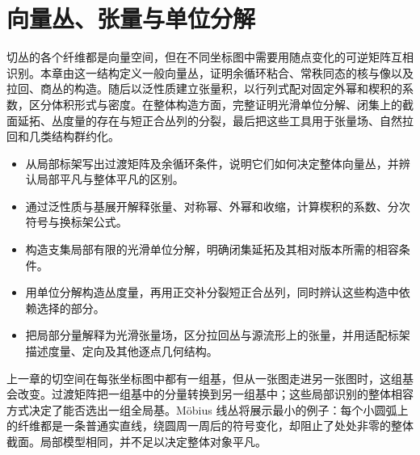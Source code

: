 
% 
% 

\chapter{向量丛、张量与单位分解}
\label{g1:ch:12}

\begin{chapterabstract}
	切丛的各个纤维都是向量空间，但在不同坐标图中需要用随点变化的可逆矩阵互相识别。本章由这一结构定义一般向量丛，证明余循环粘合、常秩同态的核与像以及拉回、商丛的构造。随后以泛性质建立张量积，以行列式配对固定外幂和楔积的系数，区分体积形式与密度。在整体构造方面，完整证明光滑单位分解、闭集上的截面延拓、丛度量的存在与短正合丛列的分裂，最后把这些工具用于张量场、自然拉回和几类结构群约化。
\end{chapterabstract}

\begin{learninggoals}
	\begin{itemize}
		\item 从局部标架写出过渡矩阵及余循环条件，说明它们如何决定整体向量丛，并辨认局部平凡与整体平凡的区别。
		\item 通过泛性质与基展开解释张量、对称幂、外幂和收缩，计算楔积的系数、分次符号与换标架公式。
		\item 构造支集局部有限的光滑单位分解，明确闭集延拓及其相对版本所需的相容条件。
		\item 用单位分解构造丛度量，再用正交补分裂短正合丛列，同时辨认这些构造中依赖选择的部分。
		\item 把局部分量解释为光滑张量场，区分拉回丛与源流形上的张量，并用适配标架描述度量、定向及其他逐点几何结构。
	\end{itemize}
\end{learninggoals}

上一章的切空间在每张坐标图中都有一组基，但从一张图走进另一张图时，这组基会改变。过渡矩阵把一组基中的分量转换到另一组基中；这些局部识别的整体相容方式决定了能否选出一组全局基。Möbius 线丛将展示最小的例子：每个小圆弧上的纤维都是一条普通实直线，绕圆周一周后的符号变化，却阻止了处处非零的整体截面。局部模型相同，并不足以决定整体对象平凡。

\ProseParagraphBreak

